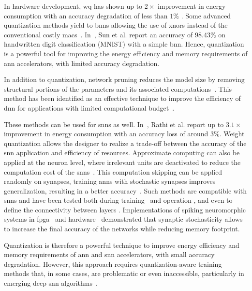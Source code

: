 In hardware development, \gls{wq} has shown up to $2\times$ improvement in energy consumption with an accuracy degradation of less than $1\%$ \cite{moons20160, whatmough201714}. Some advanced quantization methods yield to \glspl{bnn} allowing the use of \glspl{xnor} instead of the conventional costly \glspl{mac}~\cite{rastegari2016xnor}. In~\cite{sun2018xnor}, Sun et al. report an accuracy of $98.43\%$ on handwritten digit classification (MNIST) with a simple \gls{bnn}. Hence, quantization is a powerful tool for improving the energy efficiency and memory requirements of \gls{ann} accelerators, with limited accuracy degradation.

In addition to quantization, network pruning reduces the model size by removing structural portions of the parameters and its associated computations~\cite{lecun1989optimal,hassibi1992second}. This method has been identified as an effective technique to improve the efficiency of \gls{dnn} for applications with limited computational budget~\cite{molchanov2016pruning,li2016pruning, liu2018rethinking}.

These methods can be used for \glspl{snn} as well. In~\cite{rathi2018stdp}, Rathi et al. report up to $3.1\times$ improvement in energy consumption with an accuracy loss of around $3\%$. Weight quantization allows the designer to realize a trade-off between the accuracy of the \gls{snn} application and efficiency of resources. Approximate computing can also be applied at the neuron level, where irrelevant units are deactivated to reduce the computation cost of the \glspl{snn}~\cite{sen2017approximate}. This computation skipping can be applied randomly on synapses, training \glspl{ann} with stochastic synapses improves generalization, resulting in a better accuracy~\cite{srivastava2014dropout, wan2013regularization}. Such methods are compatible with \glspl{snn} and have been tested both during training~\cite{neftci2016stochastic, srinivasan2016magnetic} and operation \cite{buesing2011neural}, and even to define the connectivity between layers \cite{bellec2017deep, chen20184096}. Implementations of spiking neuromorphic systems in \gls{fpga}~\cite{sheik2016synaptic} and hardware~\cite{jerry2017ultra} demonstrated that synaptic stochasticity allows to increase the final accuracy of the networks while reducing memory footprint.

Quantization is therefore a powerful technique to improve energy efficiency and memory requirements of \gls{ann} and \gls{snn} accelerators, with small accuracy degradation. However, this approach requires quantization-aware training methods that, in some cases, are problematic or even inaccessible, particularly in emerging deep \gls{snn} algorithms~\cite{zhang2018survey}.

